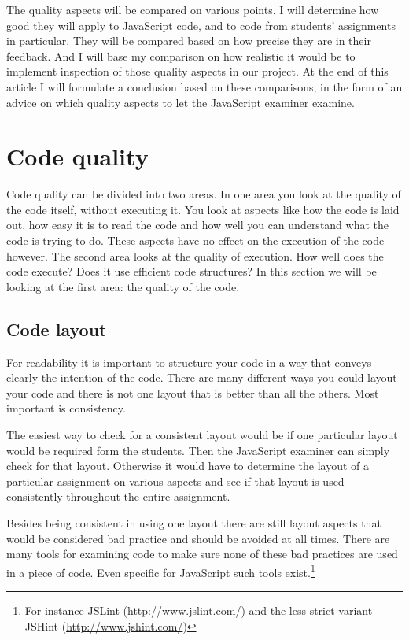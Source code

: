 \documentclass{article}
\begin{document}
The quality aspects will be compared on various points. I will determine how
good they will apply to JavaScript code, and to code from students' assignments
in particular. They will be compared based on how precise they are in their
feedback. And I will base my comparison on how realistic it would be to
implement inspection of those quality aspects in our project. At the end of this article I will formulate a conclusion based on these comparisons, in the form of an advice on which quality aspects to let the JavaScript examiner examine.

\section{Code quality}

Code quality can be divided into two areas. In one area you look at the quality
of the code itself, without executing it. You look at aspects like how the code
is laid out, how easy it is to read the code and how well you can understand
what the code is trying to do. These aspects have no effect on the execution of
the code however. The second area looks at the quality of execution. How well
does the code execute? Does it use efficient code structures? In this section we will be looking at the first area: the quality of the code.

\subsection{Code layout}

For readability it is important to structure your code in a way that conveys clearly the intention of the code. There are many different ways you could layout your code and there is not one layout that is better than all the others. Most important is consistency.

The easiest way to check for a consistent layout would be if one particular layout would be required form the students. Then the JavaScript examiner can simply check for that layout. Otherwise it would have to determine the layout of a particular assignment on various aspects and see if that layout is used consistently throughout the entire assignment.

Besides being consistent in using one layout there are still layout aspects
that would be considered bad practice and should be avoided at all times. There
are many tools for examining code to make sure none of these bad practices are
used in a piece of code. Even specific for JavaScript such tools
exist.\footnote{For instance JSLint (\url{http://www.jslint.com/}) and the less
strict variant JSHint (\url{http://www.jshint.com/})}
\end{document}
